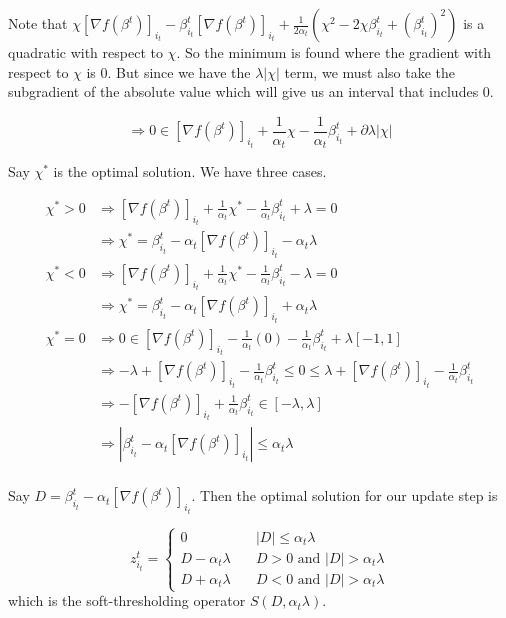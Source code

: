 \documentclass[12pt, reqno]{amsart}
\theoremstyle{definition}
\theoremstyle{remark}
\begin{document}
Note that $\chi [\nabla f(\beta^t)]_{i_t} - \beta_{i_t}^t [\nabla f(\beta^t)]_{i_t} + \frac{1}{2 \alpha _t} (\chi ^2 - 2 \chi \beta_{i_t}^t + (\beta_{i_t}^t)^2)$ is a quadratic with respect to $\chi$. So the minimum is found where the gradient with respect to $\chi$ is 0. But since we have the $\lambda |\chi|$ term, we must also take the subgradient of the absolute value which will give us an interval that includes 0.

\begin{equation*}
\Rightarrow 0 \in [\nabla f(\beta^t)]_{i_t} + \frac{1}{\alpha_t	} \chi - \frac{1}{\alpha_t} \beta_{i_t}^t + \partial \lambda | \chi |
\end{equation*}

Say $\chi ^*$ is the optimal solution. We have three cases.

\begin{equation*}
\begin{split}
\chi ^* > 0 &\Rightarrow [\nabla f(\beta^t)]_{i_t} + \frac{1}{\alpha_t	} \chi ^* - \frac{1}{\alpha_t} \beta_{i_t}^t + \lambda = 0 \\
			&\Rightarrow \chi ^* = \beta_{i_t}^t - \alpha_t [\nabla f(\beta^t)]_{i_t} - \alpha_t \lambda\\
\chi ^* < 0 &\Rightarrow [\nabla f(\beta^t)]_{i_t} + \frac{1}{\alpha_t	} \chi ^* - \frac{1}{\alpha_t} \beta_{i_t}^t - \lambda = 0 \\
			&\Rightarrow \chi ^* = \beta_{i_t}^t - \alpha_t [\nabla f(\beta^t)]_{i_t} + \alpha_t \lambda\\
\chi ^* = 0 &\Rightarrow 0 \in [\nabla f(\beta^t)]_{i_t} - \frac{1}{\alpha_t} (0) - \frac{1}{\alpha_t} \beta_{i_t}^t + \lambda [-1,1] \\
			&\Rightarrow - \lambda + [\nabla f(\beta^t)]_{i_t} - \frac{1}{\alpha_t} \beta_{i_t}^t \leq 0 \leq \lambda + [\nabla f(\beta^t)]_{i_t} - \frac{1}{\alpha_t} \beta_{i_t}^t \\
			&\Rightarrow -[\nabla f(\beta^t)]_{i_t} + \frac{1}{\alpha_t} \beta_{i_t}^t \in [-\lambda, \lambda] \\
			&\Rightarrow |\beta_{i_t}^t - \alpha_t [\nabla f(\beta^t)]_{i_t} |  \leq \alpha_t \lambda \\
\end{split}
\end{equation*}

Say $D = \beta_{i_t}^t - \alpha_t [\nabla f(\beta^t)]_{i_t}$. Then the optimal solution for our update step is 

\begin{equation*}
z_{i_t}^t = \left\{
			\begin{array}{ll}
				0 & \quad |D| \leq \alpha_t \lambda \\
				D - \alpha_t \lambda & \quad D > 0 \text{ and } |D| > \alpha_t \lambda \\
				D + \alpha_t \lambda & \quad D < 0 \text{ and } |D| > \alpha_t \lambda
			\end{array}
			\right.
\end{equation*}
which is the soft-thresholding operator $S(D, \alpha_t \lambda)$.
\end{document}
